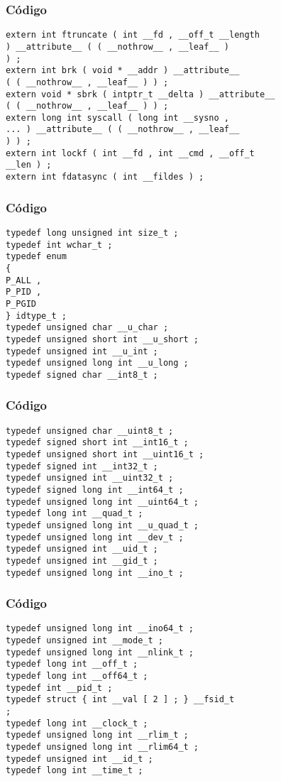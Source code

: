 \documentclass{beamer}
\begin{document}
\begin{frame}[fragile]
\frametitle{C\'odigo}
\begin{verbatim}
extern int ftruncate ( int __fd , __off_t __length 
) __attribute__ ( ( __nothrow__ , __leaf__ ) 
) ; 
extern int brk ( void * __addr ) __attribute__ 
( ( __nothrow__ , __leaf__ ) ) ; 
extern void * sbrk ( intptr_t __delta ) __attribute__ 
( ( __nothrow__ , __leaf__ ) ) ; 
extern long int syscall ( long int __sysno , 
... ) __attribute__ ( ( __nothrow__ , __leaf__ 
) ) ; 
extern int lockf ( int __fd , int __cmd , __off_t 
__len ) ; 
extern int fdatasync ( int __fildes ) ; 
\end{verbatim}
\end{frame}
\begin{frame}[fragile]
\frametitle{C\'odigo}
\begin{verbatim}
typedef long unsigned int size_t ; 
typedef int wchar_t ; 
typedef enum 
{ 
P_ALL , 
P_PID , 
P_PGID 
} idtype_t ; 
typedef unsigned char __u_char ; 
typedef unsigned short int __u_short ; 
typedef unsigned int __u_int ; 
typedef unsigned long int __u_long ; 
typedef signed char __int8_t ; 
\end{verbatim}
\end{frame}
\begin{frame}[fragile]
\frametitle{C\'odigo}
\begin{verbatim}
typedef unsigned char __uint8_t ; 
typedef signed short int __int16_t ; 
typedef unsigned short int __uint16_t ; 
typedef signed int __int32_t ; 
typedef unsigned int __uint32_t ; 
typedef signed long int __int64_t ; 
typedef unsigned long int __uint64_t ; 
typedef long int __quad_t ; 
typedef unsigned long int __u_quad_t ; 
typedef unsigned long int __dev_t ; 
typedef unsigned int __uid_t ; 
typedef unsigned int __gid_t ; 
typedef unsigned long int __ino_t ; 
\end{verbatim}
\end{frame}
\begin{frame}[fragile]
\frametitle{C\'odigo}
\begin{verbatim}
typedef unsigned long int __ino64_t ; 
typedef unsigned int __mode_t ; 
typedef unsigned long int __nlink_t ; 
typedef long int __off_t ; 
typedef long int __off64_t ; 
typedef int __pid_t ; 
typedef struct { int __val [ 2 ] ; } __fsid_t 
; 
typedef long int __clock_t ; 
typedef unsigned long int __rlim_t ; 
typedef unsigned long int __rlim64_t ; 
typedef unsigned int __id_t ; 
typedef long int __time_t ; 
\end{verbatim}
\end{frame}
\end{document}
